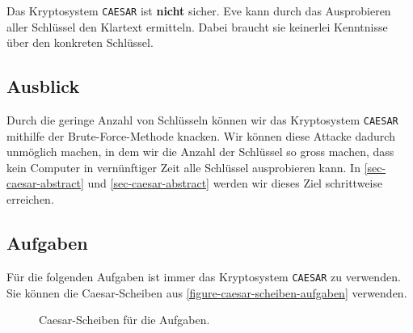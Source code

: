 \begin{important}
Das Kryptosystem \texttt{CAESAR} ist \textbf{nicht} sicher. Eve kann durch das Ausprobieren aller Schlüssel den Klartext ermitteln. Dabei braucht sie keinerlei Kenntnisse über den konkreten Schlüssel.
\end{important}

\subsection{Ausblick}

Durch die geringe Anzahl von Schlüsseln können wir das Kryptosystem \texttt{CAESAR} mithilfe der Brute-Force-Methode knacken. Wir können diese Attacke dadurch unmöglich machen, in dem wir die Anzahl der Schlüssel so gross machen, dass kein Computer in vernünftiger Zeit alle Schlüssel ausprobieren kann. In \autoref{sec-caesar-abstract} und \autoref{sec-caesar-abstract} werden wir dieses Ziel schrittweise erreichen.

\newpage

\subsection{Aufgaben}

Für die folgenden Aufgaben ist immer das Kryptosystem \texttt{CAESAR} zu verwenden. Sie können die Caesar-Scheiben aus \autoref{figure-caesar-scheiben-aufgaben} verwenden.

\begin{figure}[htb]
\centering
\begin{minipage}{0.3\textwidth}
\centering
{}
\end{minipage}
\begin{minipage}{0.3\textwidth}
\centering
{}
\end{minipage}
\begin{minipage}{0.3\textwidth}
\centering
{}
\end{minipage}
\caption{Caesar-Scheiben für die Aufgaben.}
\label{figure-caesar-scheiben-aufgaben}
\end{figure}

